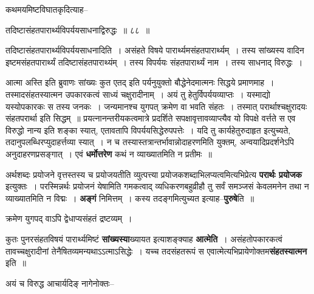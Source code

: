 \documentclass[article,12pt,a4paper]{memoir}
\begin{document}
	कथमयमिष्टविघातकृदित्याह--  
	  
	तदिष्टासंहतपारार्थ्यविपर्ययसाधनाद्विरुद्धः ॥ ८८ ॥ 
	  
	तदिष्टासंहतपारार्थ्यविपर्ययसाधनादिति । असंहते विषये पारार्थ्यमसंहतपारार्थ्यम् । तस्य सांख्यस्य वादिन इष्टमसंहतपारार्थ्यं तदिष्टासंहतपाराथ्यंम् । तस्य विपर्ययः संहतपारार्थ्यं नाम । तस्य साधनाद् विरुद्धः ।  
	  
	आत्मा अस्ति इति ब्रुवाणः सांख्यः कुत एतद् इति पर्यनुयुक्तो बौद्धेनेदमात्मनः सिद्धये प्रमाणमाह । तस्मादसंहतस्यात्मन उपकारकत्वं साध्यं चक्षुरादीनाम् । अयं तु हेतुर्विपर्ययव्याप्तः । यस्माद्यो यस्योपकारकः स तस्य जनकः । जन्यमानश्च युगपत् क्रमेण वा भवति संहतः । तस्मात् परार्थाश्चक्षुरादयः संहतपरार्था इति सिद्धम् ॥ प्रयत्नानन्तरीयकत्वमात्रे प्रदर्शिते सपक्षावृत्तावव्याप्त्यैव यो विपक्षे वर्त्तते स एव विरुद्धो नान्य इति शङ्का स्यात्, एतावतापि \leavevmode{} विपर्ययसिद्धेरुपपत्तेः । यदि तु कार्यहेतुरुदाहृत इत्युच्यते, तदानुपलब्धिरप्युदाहर्त्तव्या स्यात् । न च तस्यास्तत्रान्तर्भावान्नोदाहरणमिति युक्तम्, अन्वयादिप्रदर्शनेऽपि अनुदाहरणप्रसङ्गात् । एवं \textbf{धर्मोत्तरेण} कथं न व्याख्यातमिति न प्रतीमः ॥
	\pend
      

	  \pstart अर्थशब्दः प्रयोजने वृत्तस्तस्य च प्रयोजयतीति व्युत्पत्त्या प्रयोजकशब्दाभिलप्यत्वमित्यभिप्रेत्य \textbf{परार्थः प्रयोजक} इत्युक्तः । परस्मिन्नर्थः प्रयोजनं येषामिति गमकत्वाद् व्यधिकरणबहुव्रीहौ तु सर्वं समञ्जसं केवलमनेन तथा न व्याख्यातमिति न विद्मः । \textbf{अङ्गं} निमित्तम् । कस्य तदङ्गमित्युच्यत इत्याह--\textbf{पुरुषे}ति ॥
	\pend
      

	  \pstart क्रमेण युगपद् वाऽपि द्वेधाप्यसंहतं द्रष्टव्यम् ।
	\pend
      

	  \pstart कुतः पुनरसंहतविषयं पारार्थ्यमिष्टं \textbf{सांख्यस्या}ख्यायत इत्याशङ्क्याह \textbf{आत्मेति} । असंहतोपकारकत्वं तावच्चक्षुरादीनां तेनैषितव्यमन्यथाऽऽत्माऽसिद्धेः । यच्च तदसंहतरूपं स एवात्मेत्यभिप्रायेणोक्तम\textbf{संहतस्यात्मन} इति ॥
	\pend
	  \bigskip
	  \begingroup
	

	  \pstart अयं च विरुद्ध आचार्यदिङ् नागेनोक्तः--
	\pend
        
	  \bigskip
	  \begingroup
	
\end{document}
